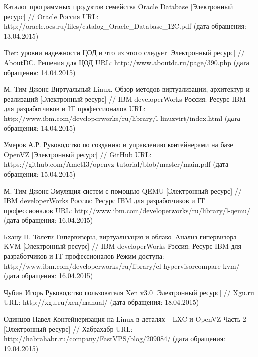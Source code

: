 \begingroup 
\renewcommand{\section}[2]{\anonsection{Библиографический список}}
\begin{thebibliography}{00}

    Каталог программных продуктов семейства Oracle Database
    [Электронный ресурс] //
    Oracle Россия
    URL: http://oracle.ocs.ru/files/catalog\_Oracle\_Database\_12C.pdf
    (дата обращения: 13.04.2015)

    Tier: уровни надежности ЦОД и что из этого следует
    [Электронный ресурс] //
    AboutDC. Решения для ЦОД
    URL: http://www.aboutdc.ru/page/390.php
    (дата обращения: 14.04.2015)

    М. Тим Джонс
    Виртуальный Linux. Обзор методов виртуализации, архитектур и реализаций
    [Электронный ресурс] //
    IBM developerWorks Россия: Ресурс IBM для разработчиков и IT профессионалов
    URL: http://www.ibm.com/developerworks/ru/library/l-linuxvirt/index.html
    (дата обращения: 14.04.2015)

    Умеров А.Р.
    Руководство по созданию и управлению контейнерами на базе OpenVZ 
    [Электронный ресурс] //
    GitHub
    URL: https://github.com/Amet13/openvz-tutorial/blob/master/main.pdf
    (дата обращения: 15.04.2015)

    М. Тим Джонс
    Эмуляция систем с помощью QEMU
    [Электронный ресурс] //
    IBM developerWorks Россия: Ресурс IBM для разработчиков и IT профессионалов
    URL: http://www.ibm.com/developerworks/ru/library/l-qemu/
    (дата обращения: 16.04.2015)

    Бхану П. Толети
    Гипервизоры, виртуализация и облако: Анализ гипервизора KVM
    [Электронный ресурс] //
    IBM developerWorks Россия: Ресурс IBM для разработчиков и IT профессионалов
    Режим доступа: http://www.ibm.com/developerworks/ru/library/cl-hypervisorcompare-kvm/
    (дата обращения: 16.04.2015)

    Чубин Игорь
    Руководство пользователя Xen v3.0
    [Электронный ресурс] //
    Xgu.ru
    URL: http://xgu.ru/xen/manual/
    (дата обращения: 18.04.2015)

    Одинцов Павел
    Контейнеризация на Linux в деталях -- LXC и OpenVZ Часть 2
    [Электронный ресурс] //
    Хабрахабр
    URL: http://habrahabr.ru/company/FastVPS/blog/209084/
    (дата обращения: 19.04.2015)


\end{thebibliography}
